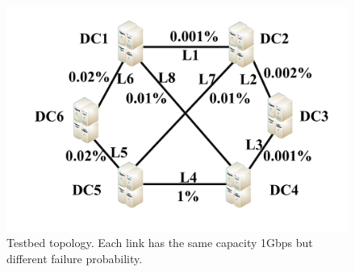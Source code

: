 \documentclass[sigconf]{acmart}
\begin{document}
 \begin{figure}
\begin{center}
\includegraphics [width=0.8\columnwidth] {fig/testbed.pdf}
\caption{Testbed topology. Each link has the same capacity 1Gbps but  different failure probability.}
\label{testbed}
\end{center}
\end{figure}
%
%
%
%
%
\end{document}

